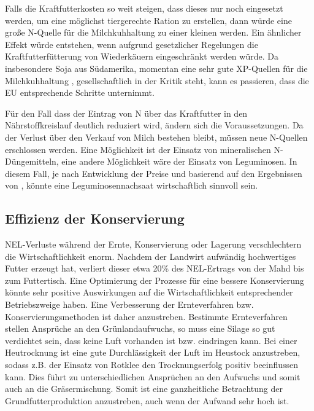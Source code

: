 Falls die Kraftfutterkosten so weit steigen, dass dieses nur noch eingesetzt werden, um eine möglichst tiergerechte Ration zu erstellen, dann würde eine große N-Quelle für die Milchkuhhaltung zu einer kleinen werden.
Ein ähnlicher Effekt würde entstehen, wenn aufgrund gesetzlicher Regelungen die Kraftfutterfütterung von Wiederkäuern eingeschränkt werden würde.
Da insbesondere Soja aus Südamerika, momentan eine sehr gute \ac{XP}-Quellen für die Milchkuhhaltung \parencite[361]{Lieitgeb1996}, gesellschaftlich in der Kritik steht, kann es passieren, dass die \ac{EU} entsprechende Schritte unternimmt.

Für den Fall dass der Eintrag von N über das Kraftfutter in den Nährstoffkreislauf deutlich reduziert wird, ändern sich die Voraussetzungen.
Da der Verlust über den Verkauf von Milch bestehen bleibt, müssen neue N-Quellen erschlossen werden.
Eine Möglichkeit ist der Einsatz von mineralischen N-Düngemitteln, eine andere Möglichkeit wäre der Einsatz von Leguminosen.
In diesem Fall, je nach Entwicklung der Preise und basierend auf den Ergebnissen von \textcite[33-36]{weggler2050leguminosen}, könnte eine Leguminosennachsaat wirtschaftlich sinnvoll sein.


\subsection{Effizienz der Konservierung}
\label{sub:konservierung}
\ac{NEL}-Verluste während der Ernte, Konservierung oder Lagerung verschlechtern die Wirtschaftlichkeit enorm.
Nachdem der Landwirt aufwändig hochwertiges Futter erzeugt hat, verliert dieser etwa 20\% des \ac{NEL}-Ertrags von der Mahd bis zum Futtertisch.
Eine Optimierung der Prozesse für eine bessere Konservierung könnte sehr positive Auswirkungen auf die Wirtschaftlichkeit entsprechender Betriebszweige haben.
Eine Verbesserung der Ernteverfahren bzw. Konservierungsmethoden ist daher anzustreben.
Bestimmte Ernteverfahren stellen Ansprüche an den Grünlandaufwuchs, so muss eine Silage so gut verdichtet sein, dass keine Luft vorhanden ist bzw. eindringen kann.
Bei einer Heutrocknung ist eine gute Durchlässigkeit der Luft im Heustock anzustreben, sodass z.B. der Einsatz von Rotklee den Trocknungserfolg positiv beeinflussen kann.
Dies führt zu unterschiedlichen Ansprüchen an den Aufwuchs und somit auch an die Gräsermischung.
Somit ist eine ganzheitliche Betrachtung der Grundfutterproduktion anzustreben, auch wenn der Aufwand sehr hoch ist.

